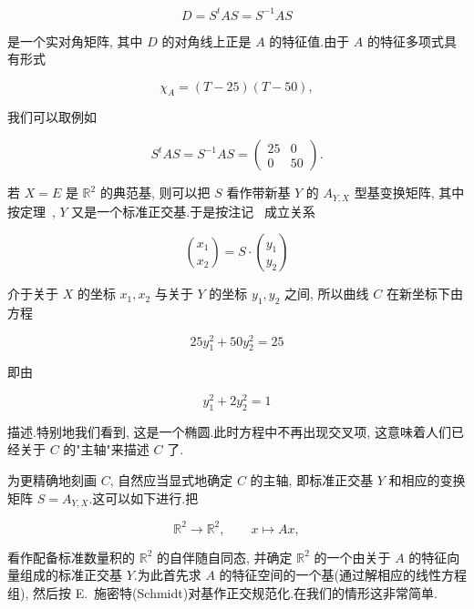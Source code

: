 \[
D = S^t A S = S^{-1} A S
\]

是一个实对角矩阵, 其中 $D$ 的对角线上正是 $A$ 的特征值.由于 $A$ 的特征多项式具有形式

\[
\chi_A = (T - 25)(T - 50),
\]

我们可以取例如

\[
S^t A S = S^{-1} A S = \begin{pmatrix} 25 & 0 \\ 0 & 50 \end{pmatrix}\text{.}
\]

若 $X = E$ 是 $\mathbb{R}^2$ 的典范基, 则可以把 $S$ 看作带新基 $Y$ 的 $A_{Y, X}$ 型基变换矩阵, 其中按定理~, $Y$ 又是一个标准正交基.于是按注记~ 成立关系

\[
\binom{x_1}{x_2} = S \cdot \binom{y_1}{y_2}
\]

介于关于 $X$ 的坐标 $x_1, x_2$ 与关于 $Y$ 的坐标 $y_1, y_2$ 之间, 所以曲线 $C$ 在新坐标下由方程

\[
25 y_1^2 + 50 y_2^2 = 25
\]

即由

\[
y_1^2 + 2 y_2^2 = 1
\]

描述.特别地我们看到, 这是一个椭圆.此时方程中不再出现交叉项, 这意味着人们已经关于 $C$ 的"主轴"来描述 $C$ 了.

\begin{center}
\end{center}

为更精确地刻画 $C$, 自然应当显式地确定 $C$ 的主轴, 即标准正交基 $Y$ 和相应的变换矩阵 $S = A_{Y, X}$.这可以如下进行.把

\[
\mathbb{R}^2 \longrightarrow \mathbb{R}^2, \qquad x \longmapsto A x,
\]

看作配备标准数量积的 $\mathbb{R}^2$ 的自伴随自同态, 并确定 $\mathbb{R}^2$ 的一个由关于 $A$ 的特征向量组成的标准正交基 $Y$.为此首先求 $A$ 的特征空间的一个基(通过解相应的线性方程组), 然后按 E.~施密特(Schmidt)对基作正交规范化.在我们的情形这非常简单.

